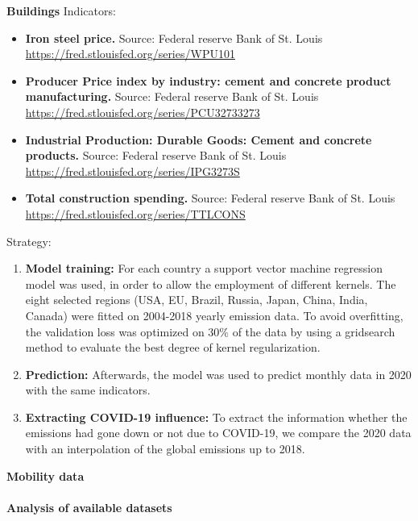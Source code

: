 \textbf{Buildings}
Indicators:
\begin{itemize}%
	\item \textbf{Iron steel price.}
	Source: Federal reserve Bank of St. Louis
	\url{https://fred.stlouisfed.org/series/WPU101}
	\item \textbf{Producer Price index by industry: cement and concrete product manufacturing.}
	Source:  Federal reserve Bank of St. Louis
	\url{https://fred.stlouisfed.org/series/PCU32733273}
	\item \textbf{Industrial Production: Durable Goods: Cement and concrete products.}
	Source:  Federal reserve Bank of St. Louis
	\url{https://fred.stlouisfed.org/series/IPG3273S}
	\item \textbf{Total construction spending.}
	Source:  Federal reserve Bank of St. Louis
	\url{https://fred.stlouisfed.org/series/TTLCONS}
\end{itemize}%
Strategy:
\begin{enumerate}
	\item \textbf{Model training:} For each country a support vector machine regression model was used, in order to allow the employment of different kernels. The eight selected regions (USA, EU, Brazil, Russia, Japan, China, India, Canada)  were fitted on 2004-2018 yearly \co emission data. To avoid overfitting, the validation loss was optimized on 30\% of the data by using a gridsearch method to evaluate the best degree of kernel regularization. 
	\item \textbf{Prediction:} Afterwards, the model was used to predict monthly data in 2020 with the same indicators.
	\item \textbf{Extracting COVID-19 influence:} To extract the information whether the emissions had gone down or not due to COVID-19, we compare the 2020 data with an interpolation of the global emissions up to 2018.
\end{enumerate}

\textbf{Mobility data}

\paragraph{Analysis of available datasets}


